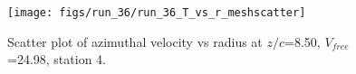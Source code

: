 \begin{figure}[H]
\centering
\texttt{[image: figs/run\_36/run\_36\_T\_vs\_r\_meshscatter]}
\caption{Scatter plot of azimuthal velocity vs radius at $z/c$=8.50, $V_{free}$=24.98, station 4.}
\label{fig:run_36_T_vs_r_meshscatter}
\end{figure}


